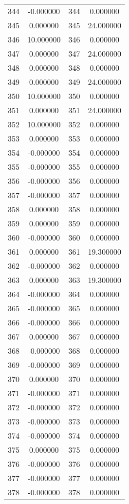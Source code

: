 \documentclass[12pt]{article}
\begin{document}
\begin{longtable}{@{}cccc@{}}
344 & -0.000000 & 344 & 0.000000 \\
345 & 0.000000 & 345 & 24.000000 \\
346 & 10.000000 & 346 & 0.000000 \\
347 & 0.000000 & 347 & 24.000000 \\
348 & 0.000000 & 348 & 0.000000 \\
349 & 0.000000 & 349 & 24.000000 \\
350 & 10.000000 & 350 & 0.000000 \\
351 & 0.000000 & 351 & 24.000000 \\
352 & 10.000000 & 352 & 0.000000 \\
353 & 0.000000 & 353 & 0.000000 \\
354 & -0.000000 & 354 & 0.000000 \\
355 & -0.000000 & 355 & 0.000000 \\
356 & -0.000000 & 356 & 0.000000 \\
357 & -0.000000 & 357 & 0.000000 \\
358 & 0.000000 & 358 & 0.000000 \\
359 & 0.000000 & 359 & 0.000000 \\
360 & -0.000000 & 360 & 0.000000 \\
361 & 0.000000 & 361 & 19.300000 \\
362 & -0.000000 & 362 & 0.000000 \\
363 & 0.000000 & 363 & 19.300000 \\
364 & -0.000000 & 364 & 0.000000 \\
365 & -0.000000 & 365 & 0.000000 \\
366 & -0.000000 & 366 & 0.000000 \\
367 & 0.000000 & 367 & 0.000000 \\
368 & -0.000000 & 368 & 0.000000 \\
369 & -0.000000 & 369 & 0.000000 \\
370 & 0.000000 & 370 & 0.000000 \\
371 & -0.000000 & 371 & 0.000000 \\
372 & -0.000000 & 372 & 0.000000 \\
373 & -0.000000 & 373 & 0.000000 \\
374 & -0.000000 & 374 & 0.000000 \\
375 & 0.000000 & 375 & 0.000000 \\
376 & -0.000000 & 376 & 0.000000 \\
377 & -0.000000 & 377 & 0.000000 \\
378 & -0.000000 & 378 & 0.000000 \\

\end{longtable}
\end{document}
